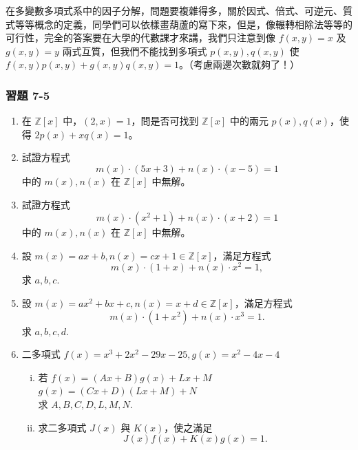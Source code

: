 \begin{example}\label{ex:7-2-9}
在多變數多項式系中的因子分解，問題要複雜得多，關於因式、倍式、可逆元、質式等等概念的定義，同學們可以依樣畫葫蘆的寫下來，但是，像輾轉相除法等等的可行性，完全的答案要在大學的代數課才來講，我們只注意到像 $f(x, y) = x$ 及 $g(x, y) = y$ 兩式互質，但我們不能找到多項式 $p(x, y), q(x, y)$ 使 $f(x, y)p(x, y)+g(x, y)q(x, y) = 1$。（考慮兩邊次數就夠了！）
\end{example}

\subsubsection*{習題 7-5}\label{sec:ex7-5}

\begin{enumerate}[1.]
  \item 在 $\mathbb{Z}[x]$ 中，$(2, x) = 1$，問是否可找到 $\mathbb{Z}[x]$ 中的兩元 $p(x), q(x)$，使得 $2p(x)+xq(x) = 1$。

  \item 試證方程式
  \begin{equation*}
    m(x) \cdot (5x+3) + n(x) \cdot (x-5) = 1
  \end{equation*}
  中的 $m(x), n(x)$ 在 $\mathbb{Z}[x]$ 中無解。

  \item 試證方程式
  \begin{equation*}
    m(x) \cdot (x^2+1) + n(x) \cdot (x+2) = 1
  \end{equation*}
  中的 $m(x), n(x)$ 在 $\mathbb{Z}[x]$ 中無解。

  \item 設 $m(x) = ax+b, n(x) = cx+1 \in \mathbb{Z}[x]$，滿足方程式
  \begin{equation*}
    m(x) \cdot (1+x) + n(x) \cdot x^2 = 1,
  \end{equation*}
  求 $a, b, c$.

  \item 設 $m(x) = ax^2+bx+c, n(x) = x+d \in \mathbb{Z}[x]$，滿足方程式
  \begin{equation*}
    m(x) \cdot (1+x^2) + n(x) \cdot x^3 = 1.
  \end{equation*}
  求 $a, b, c, d$.

  \item 二多項式 $f(x) = x^3+2x^2-29x-25, g(x) = x^2-4x-4$
  \begin{enumerate}[(i)]
    \item 若 $f(x) = (Ax+B)g(x)+Lx+M$\\
    $g(x) = (Cx+D)(Lx+M)+N$\\
    求 $A, B, C, D, L, M, N$.
    \item 求二多項式 $J(x)$ 與 $K(x)$，使之滿足
    \begin{equation*}
      J(x)f(x)+K(x)g(x) = 1.
    \end{equation*}
  \end{enumerate}
\end{enumerate}

